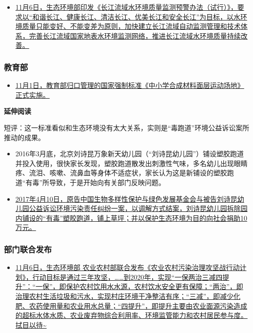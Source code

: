 \documentclass[]{book}
\providecommand{\tightlist}{%
  \setlength{\itemsep}{0pt}\setlength{\parskip}{0pt}}
\begin{document}
\begin{itemize}
\tightlist
\item
  \href{http://www.ywrp.gov.cn/bzgf/6253.html}{11月6日，生态环境部印发《长江流域水环境质量监测预警办法（试行）》，要求以``和谐长江、健康长江、清洁长江、优美长江和安全长江''为目标，以水环境质量只能变好、不能变差为原则，加快建立长江流域自动监测管理和技术体系，完善长江流域国家地表水环境监测网络，推进长江流域水环境质量持续改善。}
\end{itemize}

\hypertarget{ux6559ux80b2ux90e8}{%
\subsubsection*{教育部}\label{ux6559ux80b2ux90e8}}

\begin{itemize}
\tightlist
\item
  \href{http://www.moe.gov.cn/srcsite/A17/moe_938/s3273/201811/t20181101_353337.htm}{11月1日，教育部归口管理的国家强制标准《中小学合成材料面层运动场地》正式实施。}
\end{itemize}

\textbf{延伸阅读}

短评：这一标准看似和生态环境没有太大关系，实则是``毒跑道''环境公益诉讼案所推动的成果。

\begin{itemize}
\item
  2016年3月底，北京刘诗昆万象新天幼儿园（``刘诗昆幼儿园''）铺设塑胶跑道并投入使用，很快家长发现，塑胶跑道散发出刺激性气味，多名幼儿出现眼睛疼、流泪、咳嗽、流鼻血等身体不适症状，家长认为这是新铺设的塑胶跑道``有毒''所导致，于是开始向有关部门反映问题。
\item
  \href{http://news.sina.com.cn/o/2018-02-05/doc-ifyreuzn3040514.shtml}{2017年4月10日，原告中国生物多样性保护与绿色发展基金会与被告刘诗昆幼儿园公益诉讼环境污染责任纠纷一案，以调解方式结案，刘诗昆幼儿园拆除园内铺设的``有毒''塑胶跑道，铺上草坪；并以保护生态环境为目的向社会捐助10万元。}
\end{itemize}

\hypertarget{ux90e8ux95e8ux8054ux5408ux53d1ux5e03}{%
\subsubsection*{部门联合发布}\label{ux90e8ux95e8ux8054ux5408ux53d1ux5e03}}

\begin{itemize}
\tightlist
\item
  \href{http://www.mee.gov.cn/xxgk2018/xxgk/xxgk03/201811/t20181108672959.htm}{11月6日，生态环境部 农业农村部联合发布《农业农村污染治理攻坚战行动计划》，行动目标是通过三年攻坚，\ldots{}\ldots{}到2020年，实现``一保两治三减四提升''：``一保''，即保护农村饮用水水源，农村饮水安全更有保障；``两治''，即治理农村生活垃圾和污水，实现村庄环境干净整洁有序；``三减''，即减少化肥、农药使用量和农业用水总量；``四提升''，即提升主要由农业面源污染造成的超标水体水质、农业废弃物综合利用率、环境监管能力和农村居民参与度。拭目以待\textasciitilde{}}
\end{itemize}
\end{document}
